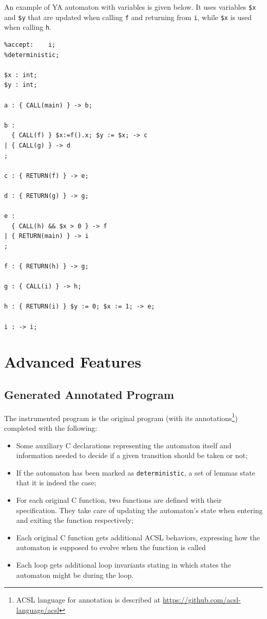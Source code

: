 \documentclass{frama-c-book}
\begin{document}
An example of YA automaton with variables is given below. It uses variables \lstinline|$x| and
\lstinline|$y| that are updated when calling \lstinline|f| and returning from \lstinline|i|,
while \lstinline|$x| is used when calling \lstinline|h|.%

\begin{lstlisting}[language=ya]
%init:		a;
%accept:	i;
%deterministic;

$x : int;
$y : int;

a : { CALL(main) } -> b;

b :
  { CALL(f) } $x:=f().x; $y := $x; -> c
| { CALL(g) } -> d
;

c : { RETURN(f) } -> e;

d : { RETURN(g) } -> g;

e :
  { CALL(h) && $x > 0 } -> f
| { RETURN(main) } -> i
;

f : { RETURN(h) } -> g;

g : { CALL(i) } -> h;

h : { RETURN(i) } $y := 0; $x := 1; -> e;

i : -> i;
\end{lstlisting}

\chapter{Advanced Features}
\section{Generated Annotated Program}
\label{generated_annotated_file}

The instrumented program is
the original program (with its annotations\footnote{ ACSL language for
  annotation is described at \url{https://github.com/acsl-language/acsl}})
completed with the following:
\begin{itemize}
\item Some auxiliary C declarations representing the automaton itself
and information needed to decide if a given transition should be taken or not;
\item If the automaton has been marked as \texttt{deterministic}, a set of
lemmas state that it is indeed the case;
\item For each original C function, two functions are defined with their
specification. They take care of updating the automaton's state when entering
and exiting the function respectively;
\item Each original C function gets additional ACSL behaviors, expressing how
the automaton is supposed to evolve when the function is called
\item Each loop gets additional loop invariants stating in which states the
automaton might be during the loop.
\end{itemize}
\end{document}
